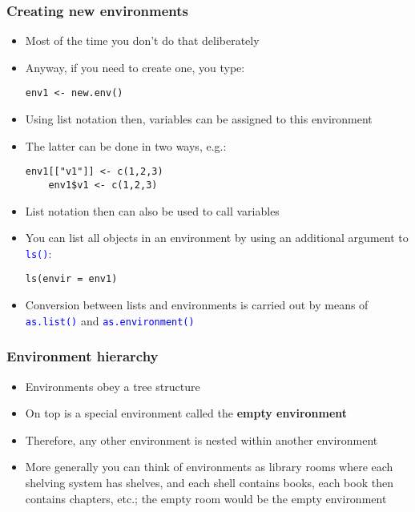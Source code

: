\documentclass[10pt]{beamer}
\newcommand{\cc}[1]{\texttt{\textcolor{blue}{#1}}}
\theoremstyle{definition}
\begin{document}
\begin{frame}[fragile]
\frametitle{Creating new environments}
\begin{itemize}
	\item Most of the time you don't do that deliberately
	\item Anyway, if you need to create one, you type:
	\begin{lstlisting}[style = rstyle, breaklines]
	env1 <- new.env()
	\end{lstlisting}
	\item Using list notation then, variables can be assigned to this environment
	\item The latter can be done in two ways, e.g.:
	\begin{lstlisting}[style = rstyle, breaklines]
	env1[["v1"]] <- c(1,2,3)
	env1$v1 <- c(1,2,3)
	\end{lstlisting}
	\item List notation then can also be used to call variables
	\item You can list all objects in an environment by using an additional argument to \cc{ls()}:
	\begin{lstlisting}[style = rstyle, breaklines]
	ls(envir = env1)
	\end{lstlisting}
	\item Conversion between lists and environments is carried out by means of \cc{as.list()} and \cc{as.environment()}
\end{itemize} 
\end{frame}

\begin{frame}[fragile]
\frametitle{Environment hierarchy}
\begin{itemize}
	\item Environments obey a tree structure
	\item On top is a special environment called the \textbf{empty environment}
	\item Therefore, any other environment is nested within another environment
	\item More generally you can think of environments as library rooms where each shelving system has shelves, and each shell contains books, each book then contains chapters, etc.; the empty room would be the empty environment
\end{itemize}
\end{frame}
\end{document}

